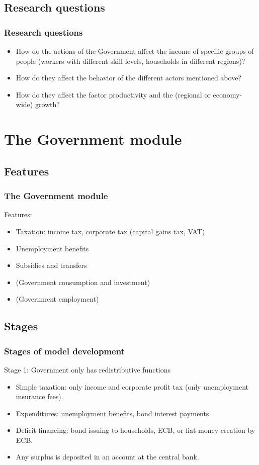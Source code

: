 \documentclass{beamer}
\begin{document}
\subsection{Research questions}
\begin{frame}{}
\frametitle{Research questions}
\begin{itemize}
\item How do the actions of the Government affect the income of specific
groups of people (workers with different skill levels, households in
different regions)?

\item How do they affect the behavior of the different actors mentioned
above?

\item How do they affect the factor productivity and the (regional or
economy-wide) growth?
\end{itemize}
\end{frame}

\section{The Government module}
\subsection{Features}
\begin{frame}{}
\frametitle{The Government module}
Features:
\begin{itemize}
\item Taxation: income tax, corporate tax (capital gains tax, VAT)
\item Unemployment benefits
\item Subsidies and transfers
\item (Government consumption and investment)
\item (Government employment)
\end{itemize}
\end{frame}

\subsection{Stages}
\begin{frame}{}
\frametitle{Stages of model development}
Stage 1: Government only has redistributive functions
\begin{itemize}
\item Simple taxation: only income and corporate profit tax (only unemployment insurance fees).
\item Expenditures: unemployment benefits, bond interest payments.
\item Deficit financing: bond issuing to households, ECB, or fiat money creation by ECB.
\item Any surplus is deposited in an account at the central bank.
\end{itemize}
\end{frame}
\end{document}

